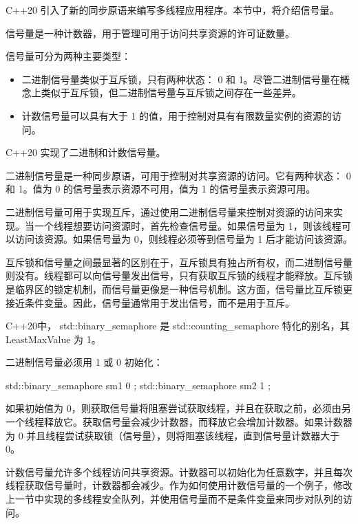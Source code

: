 
C++20 引入了新的同步原语来编写多线程应用程序。本节中，将介绍信号量。

信号量是一种计数器，用于管理可用于访问共享资源的许可证数量。

信号量可分为两种主要类型：

\begin{itemize}
\item
二进制信号量类似于互斥锁，只有两种状态： 0 和 1。尽管二进制信号量在概念上类似于互斥锁，但二进制信号量与互斥锁之间存在一些差异。

\item
计数信号量可以具有大于 1 的值，用于控制对具有有限数量实例的资源的访问。
\end{itemize}

C++20 实现了二进制和计数信号量。


二进制信号量是一种同步原语，可用于控制对共享资源的访问。它有两种状态： 0 和 1。值为 0 的信号量表示资源不可用，值为 1 的信号量表示资源可用。

二进制信号量可用于实现互斥，通过使用二进制信号量来控制对资源的访问来实现。当一个线程想要访问资源时，首先检查信号量。如果信号量为 1，则该线程可以访问该资源。如果信号量为 0，则线程必须等到信号量为 1 后才能访问该资源。

互斥锁和信号量之间最显著的区别在于，互斥锁具有独占所有权，而二进制信号量则没有。线程都可以向信号量发出信号，只有获取互斥锁的线程才能释放。互斥锁是临界区的锁定机制，而信号量更像是一种信号机制。这方面，信号量比互斥锁更接近条件变量。因此，信号量通常用于发出信号，而不是用于互斥。

C++20中， std::binary\_semaphore 是 std::counting\_semaphore 特化的别名，其 LeastMaxValue 为 1。

二进制信号量必须用 1 或 0 初始化：

\begin{cpp}
std::binary_semaphore sm1{ 0 };
std::binary_semaphore sm2{ 1 };
\end{cpp}

如果初始值为 0，则获取信号量将阻塞尝试获取线程，并且在获取之前，必须由另一个线程释放它。获取信号量会减少计数器，而释放它会增加计数器。如果计数器为 0 并且线程尝试获取锁（信号量），则将阻塞该线程，直到信号量计数器大于 0。


计数信号量允许多个线程访问共享资源。计数器可以初始化为任意数字，并且每次线程获取信号量时，计数器都会减少。作为如何使用计数信号量的一个例子，修改上一节中实现的多线程安全队列，并使用信号量而不是条件变量来同步对队列的访问。

